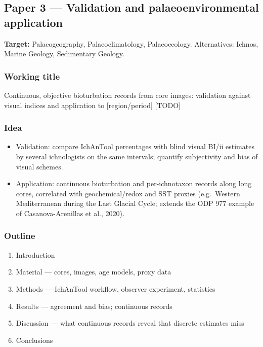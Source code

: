 \documentclass[
  10pt,
]{article}
\providecommand{\tightlist}{%
  \setlength{\itemsep}{0pt}\setlength{\parskip}{0pt}}
\begin{document}
\hypertarget{paper-3-validation-and-palaeoenvironmental-application}{%
\subsection{Paper 3 --- Validation and palaeoenvironmental
application}\label{paper-3-validation-and-palaeoenvironmental-application}}

\textbf{Target:} Palaeogeography, Palaeoclimatology, Palaeoecology.
Alternatives: Ichnos, Marine Geology, Sedimentary Geology.

\hypertarget{working-title-1}{%
\subsubsection{Working title}\label{working-title-1}}

Continuous, objective bioturbation records from core images: validation
against visual indices and application to {[}region/period{]} {[}TODO{]}

\hypertarget{idea}{%
\subsubsection{Idea}\label{idea}}

\begin{itemize}
\tightlist
\item
  Validation: compare IchAnTool percentages with blind visual BI/ii
  estimates by several ichnologists on the same intervals; quantify
  subjectivity and bias of visual schemes.
\item
  Application: continuous bioturbation and per-ichnotaxon records along
  long cores, correlated with geochemical/redox and SST proxies
  (e.g.~Western Mediterranean during the Last Glacial Cycle; extends the
  ODP 977 example of Casanova-Arenillas et al., 2020).
\end{itemize}

\hypertarget{outline-1}{%
\subsubsection{Outline}\label{outline-1}}

\begin{enumerate}
\def\labelenumi{\arabic{enumi}.}
\tightlist
\item
  Introduction
\item
  Material --- cores, images, age models, proxy data
\item
  Methods --- IchAnTool workflow, observer experiment, statistics
\item
  Results --- agreement and bias; continuous records
\item
  Discussion --- what continuous records reveal that discrete estimates
  miss
\item
  Conclusions
\end{enumerate}
\end{document}
